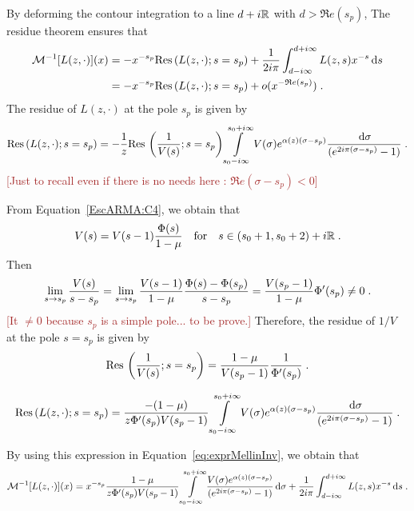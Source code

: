 \documentclass[11pt]{amsart}
\renewcommand{\Re}{\mathfrak{R}e}
\newcommand{\diff}{\,\mathrm{d}}
\newcommand{\ndr}[1]{\textcolor{brown}{[#1]}}
\newcommand{\res}{\mathrm{Res}\,}
\begin{document}
By deforming the contour integration to a line $d+i\mathbb{R}$ with $d > \Re(s_p)$, The residue theorem ensures that
\begin{subequations}
\begin{align}
    \Mcal^{-1}[L(z,\cdot)](x) 
    &= - x^{-s_p}\res(L(z,\cdot);s = s_p) +  \frac{1}{2i\pi} \int_{d-i\infty}^{d+i\infty} L(z,s)x^{-s}\diff s\\
    &= - x^{-s_p}\res(L(z,\cdot);s = s_p) + o(x^{-\Re(s_p)})
    \eqfinp
\end{align}
\label{eq:exprMellinInv}
\end{subequations}
The residue of $L(z,\cdot)$ at the pole $s_p$ is given by 
\begin{equation*}
    \res(L(z,\cdot);s = s_p) 
    = 
    - \frac{1}{z}\res\left( \frac{1}{V(s)}; s = s_p\right) \int\limits_{s_0-i\infty}^{s_0+i\infty}
    V(\sigma) e^{ \alpha(z)(\sigma-s_p)}
   \frac{\diff \sigma}{(e^{2i\pi(\sigma-s_p)}-1)}
   \eqfinp
\end{equation*}
\ndr{Just to recall even if there is no needs here : $\Re(\sigma-s_p) < 0$}

From Equation~\eqref{EscARMA:C4}, we obtain that
$$ V(s) = V(s-1)\frac{\Phi(s)}{1-\mu}
        \quad \text{for} \quad
        s \in (s_0+1, s_0+2) + i\mathbb{R}
        \; .$$
Then 
$$ \lim_{s\to s_p} \frac{V(s)}{s-s_p} 
= \lim_{s\to s_p} \frac{V(s-1)}{1-\mu} \frac{\Phi(s)-\Phi(s_p)}{s-s_p}
=  \frac{V(s_p-1)}{1-\mu} \Phi'(s_p) \neq 0 \; .$$
\ndr{It $\neq 0$ because $s_p$ is a simple pole... to be prove.}
Therefore, the  residue of $1/V$ at the pole $s = s_p$ is given by 
$$ \res\left( \frac{1}{V(s)}; s = s_p\right) = \frac{1-\mu}{V(s_p-1)} \frac{1}{\Phi'(s_p)} \eqfinp$$

\begin{equation}
    \res(L(z,\cdot);s = s_p) 
    = 
     \frac{-(1-\mu)}{z \Phi'(s_p) V(s_p-1)}
     \int\limits_{s_0-i\infty}^{s_0+i\infty}
    V(\sigma) e^{ \alpha(z)(\sigma-s_p)}
   \frac{\diff \sigma}{(e^{2i\pi(\sigma-s_p)}-1)}
   \eqfinp
\end{equation}

By using this expression in Equation~\eqref{eq:exprMellinInv}, we obtain that 
\begin{equation*}
    \Mcal^{-1}[L(z,\cdot)](x) 
    = x^{-s_p}\frac{1-\mu}{z \Phi'(s_p) V(s_p-1)}
     \int\limits_{s_0-i\infty}^{s_0+i\infty}
     \frac{V(\sigma) e^{ \alpha(z)(\sigma-s_p)}
  }{(e^{2i\pi(\sigma-s_p)}-1)}\diff \sigma + \frac{1}{2i\pi} \int_{d-i\infty}^{d+i\infty} L(z,s)x^{-s}\diff s
    \eqfinp
\end{equation*}
\end{document}
